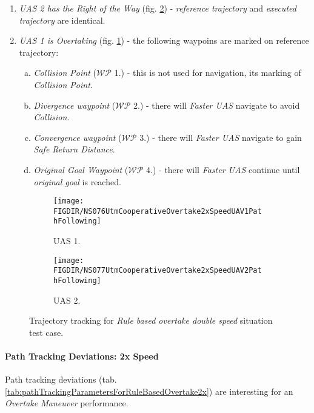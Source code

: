     \begin{enumerate}
        \item \emph{UAS 2 has the Right of the Way} (fig. \ref{fig:ruleBasedOvertake2xPathTrackingUAS2}) - \emph{reference trajectory} and \emph{executed trajectory} are identical. 
        
        \item \emph{UAS 1 is Overtaking} (fig. \ref{fig:ruleBasedOvertake2xdPathTrackingUAS1}) - the following waypoins are marked on reference trajectory:
        \begin{enumerate}[a.]
            \item \emph{Collision Point} ($\mathscr{WP}$ 1.) - this is not used for navigation, its marking of \emph{Collision Point}.
            \item \emph{Divergence waypoint} ($\mathscr{WP}$ 2.) - there will \emph{Faster UAS} navigate to avoid \emph{Collision}.
            \item \emph{Convergence waypoint} ($\mathscr{WP}$ 3.) - there will \emph{Faster UAS} navigate to gain \emph{Safe Return Distance}.
            \item \emph{Original Goal Waypoint} ($\mathscr{WP}$ 4.) - there will \emph{Faster UAS} continue until \emph{original goal} is reached. 
        \end{enumerate}
    \end{enumerate}
    
    \begin{figure}[H]
        \centering
        \begin{subfigure}{0.48\textwidth}
        	\centering
            \texttt{[image: \\FIGDIR/NS076UtmCooperativeOvertake2xSpeedUAV1PathFollowing]}
            \caption{UAS 1.}
            \label{fig:ruleBasedOvertake2xdPathTrackingUAS1}
        \end{subfigure}
        \begin{subfigure}{0.48\textwidth}
        	\centering
            \texttt{[image: \\FIGDIR/NS077UtmCooperativeOvertake2xSpeedUAV2PathFollowing]} 
            \caption{UAS 2.}
            \label{fig:ruleBasedOvertake2xPathTrackingUAS2}
        \end{subfigure}
        \caption{Trajectory tracking for \emph{Rule based overtake double speed} situation test case.}
        \label{fig:testCaseRuleBasedOvertake2xTrajectoryTracking}
    \end{figure}
    
    \paragraph{Path Tracking Deviations: 2x Speed} Path tracking deviations (tab. \ref{tab:pathTrackingParametersForRuleBasedOvertake2x}) are interesting for an \emph{Overtake Maneuver} performance. 
    
